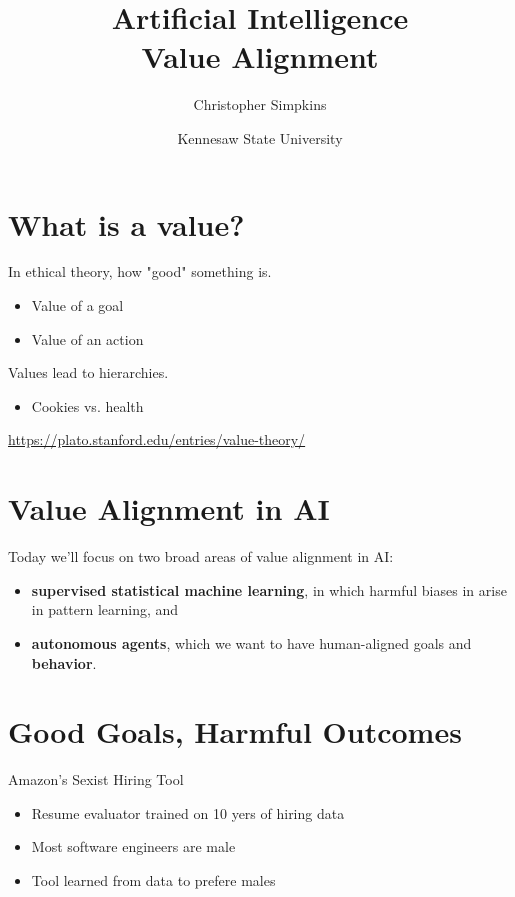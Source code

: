\documentclass[11pt]{article}
\author{Christopher Simpkins}
\date{Kennesaw State University}
\title{Artificial Intelligence\\\medskip
\large Value Alignment}
\begin{document}
\maketitle
\section{What is a value?}
\label{sec:orgb1ba018}

In ethical theory, how "good" something is.

\begin{itemize}
\item Value of a goal
\item Value of an action
\end{itemize}

Values lead to hierarchies.

\begin{itemize}
\item Cookies vs. health
\end{itemize}

\url{https://plato.stanford.edu/entries/value-theory/}
\section{Value Alignment in AI}
\label{sec:orgc3017ab}

Today we'll focus on two broad areas of value alignment in AI:

\begin{itemize}
\item \textbf{supervised statistical machine learning}, in which harmful biases in arise in pattern learning, and
\item \textbf{autonomous agents}, which we want to have human-aligned goals and \textbf{behavior}.
\end{itemize}
\section{Good Goals, Harmful Outcomes}
\label{sec:orgcc58473}

Amazon's Sexist Hiring Tool

\begin{itemize}
\item Resume evaluator trained on 10 yers of hiring data
\item Most software engineers are male
\item Tool learned from data to prefere males
\end{itemize}
\end{document}
